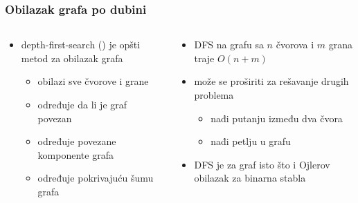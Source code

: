 \documentclass[compress]{beamer}
\begin{document}
\begin{frame}[fragile]
  \frametitle{Obilazak grafa po dubini}
  \begin{columns}
    \begin{column}[t]{6cm}
      \begin{itemize}
        \item depth-first-search () je opšti metod za 
        obilazak grafa
        \begin{itemize}
          \item obilazi sve čvorove i grane
          \item određuje da li je graf povezan
          \item određuje povezane komponente grafa
          \item određuje pokrivajuću šumu grafa
        \end{itemize}
      \end{itemize}
    \end{column}
    \begin{column}[t]{6cm}
      \begin{itemize}
        \item DFS na grafu sa $n$ čvorova i $m$ grana traje $O(n+m)$
        \item može se proširiti za rešavanje drugih problema
        \begin{itemize}
          \item nađi putanju između dva čvora
          \item nađi petlju u grafu
        \end{itemize}
        \item DFS je za graf isto što i Ojlerov obilazak za binarna 
          stabla
      \end{itemize}
    \end{column}
  \end{columns}
\end{frame}
\end{document}
